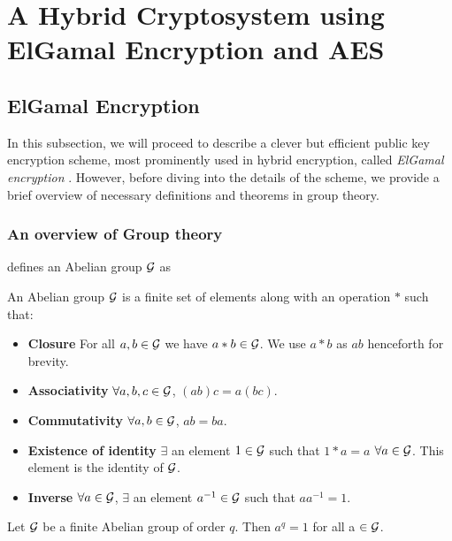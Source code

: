 \section{A Hybrid Cryptosystem using ElGamal Encryption and AES}

\label{sec:elgamal} 

\subsection{ElGamal Encryption}
In this subsection, we will proceed to describe a clever but efficient public key encryption scheme, most prominently used in hybrid encryption, called \textit{ElGamal encryption} \cite{Elgamal_1985}. 
However, before diving into the details of the scheme, we provide a brief overview of necessary definitions and theorems in group theory.

\subsubsection{An overview of Group theory}

\cite{koocmsc} defines an Abelian group $ \mathcal{G} $ as

\begin{definition}
An Abelian group $ \mathcal{G} $ is a finite set of elements along with an operation $ * $ such that:

\begin{itemize}
    \item \textbf{Closure} For all $ a, b \in \mathcal{G} $ we have $ a * b \in \mathcal{G} $. We use $ a * b $ as $ ab $ henceforth for brevity.
    \item \textbf{Associativity} $ \forall a, b, c \in \mathcal{G} $, $ (ab)c = a(bc) $.
    \item \textbf{Commutativity} $ \forall a, b \in \mathcal{G} $, $ ab = ba $.
    \item \textbf{Existence of identity} $ \exists $ an element $ 1 \in \mathcal{G} $ such that $ 1 * a = a $ $ \forall a \in \mathcal{G} $. This element is the identity of $ \mathcal{G} $.
    \item \textbf{Inverse} $ \forall a \in \mathcal{G}$, $ \exists $ an element $ a^{-1} \in \mathcal{G} $ such that $ aa^{-1} = 1 $.
\end{itemize}
\end{definition}

\begin{theorem}
Let $\mathcal{G}$ be a finite Abelian group of order $ q $. Then $ a^q = 1 $ for all a $\in \mathcal{G}$.
\end{theorem}

